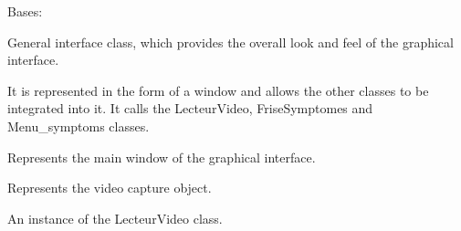 \documentclass[letterpaper,10pt,english]{sphinxmanual}
\begin{document}
\begin{fulllineitems}
\label{\detokenize{general_interface:general_interface_V10.InterfaceGenerale}}
\pysigstartsignatures
{}
\pysigstopsignatures
\sphinxAtStartPar
Bases: 

\sphinxAtStartPar
General interface class, which provides the overall look and feel of the graphical interface.

\sphinxAtStartPar
It is represented in the form of a window and allows the other classes to be integrated into it.
It calls the LecteurVideo, FriseSymptomes and Menu\_symptoms classes.

\begin{fulllineitems}
\label{\detokenize{general_interface:general_interface_V10.InterfaceGenerale.fenetre}}
\pysigstartsignatures
{}
\pysigstopsignatures
\sphinxAtStartPar
Represents the main window of the graphical interface.

\end{fulllineitems}


\begin{fulllineitems}
\label{\detokenize{general_interface:general_interface_V10.InterfaceGenerale.cap}}
\pysigstartsignatures
{}
\pysigstopsignatures
\sphinxAtStartPar
Represents the video capture object.

\end{fulllineitems}


\begin{fulllineitems}
\label{\detokenize{general_interface:general_interface_V10.InterfaceGenerale.lec_video}}
\pysigstartsignatures
{}
\pysigstopsignatures
\sphinxAtStartPar
An instance of the LecteurVideo class.


\end{fulllineitems}
\end{fulllineitems}
\end{document}
